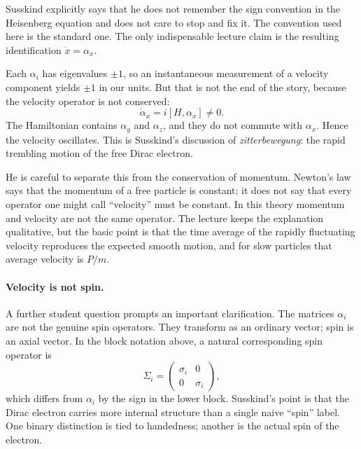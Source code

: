 \begin{remark}
Susskind explicitly says that he does not remember the sign convention in the Heisenberg equation and does not care to stop and fix it. The convention used here is the standard one. The only indispensable lecture claim is the resulting identification \(\dot x=\alpha_x\).
\end{remark}

Each \(\alpha_i\) has eigenvalues \(\pm1\), so an instantaneous measurement of a velocity component yields \(\pm1\) in our units. But that is not the end of the story, because the velocity operator is not conserved:
\begin{equation}
\dot\alpha_x=i[H,\alpha_x]\neq0.
\end{equation}
The Hamiltonian contains \(\alpha_y\) and \(\alpha_z\), and they do not commute with \(\alpha_x\). Hence the velocity oscillates. This is Susskind's discussion of \emph{zitterbewegung}: the rapid trembling motion of the free Dirac electron.

He is careful to separate this from the conservation of momentum. Newton's law says that the momentum of a free particle is constant; it does not say that every operator one might call ``velocity'' must be constant. In this theory momentum and velocity are not the same operator. The lecture keeps the explanation qualitative, but the basic point is that the time average of the rapidly fluctuating velocity reproduces the expected smooth motion, and for slow particles that average velocity is \(P/m\).

\paragraph{Velocity is not spin.}
A further student question prompts an important clarification. The matrices \(\alpha_i\) are not the genuine spin operators. They transform as an ordinary vector; spin is an axial vector. In the block notation above, a natural corresponding spin operator is
\begin{equation}
\Sigma_i=
\begin{pmatrix}
\sigma_i&0\\
0&\sigma_i
\end{pmatrix},
\end{equation}
which differs from \(\alpha_i\) by the sign in the lower block. Susskind's point is that the Dirac electron carries more internal structure than a single naive ``spin'' label. One binary distinction is tied to handedness; another is the actual spin of the electron.

